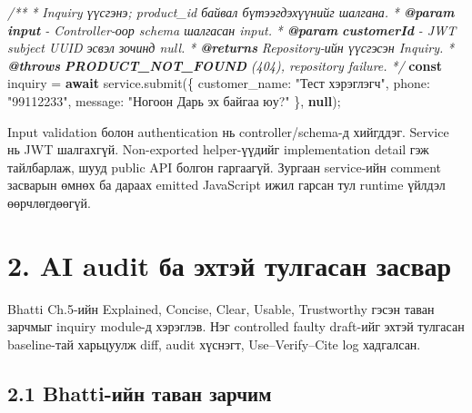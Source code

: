 \documentclass[
  mongolian,
]{article}
\newenvironment{Shaded}{}{}
\newcommand{\AnnotationTok}[1]{\textcolor[rgb]{0.38,0.63,0.69}{\textbf{\textit{#1}}}}
\newcommand{\CommentTok}[1]{\textcolor[rgb]{0.38,0.63,0.69}{\textit{#1}}}
\newcommand{\CommentVarTok}[1]{\textcolor[rgb]{0.38,0.63,0.69}{\textbf{\textit{#1}}}}
\newcommand{\ControlFlowTok}[1]{\textcolor[rgb]{0.00,0.44,0.13}{\textbf{#1}}}
\newcommand{\FunctionTok}[1]{\textcolor[rgb]{0.02,0.16,0.49}{#1}}
\newcommand{\KeywordTok}[1]{\textcolor[rgb]{0.00,0.44,0.13}{\textbf{#1}}}
\newcommand{\NormalTok}[1]{#1}
\newcommand{\OperatorTok}[1]{\textcolor[rgb]{0.40,0.40,0.40}{#1}}
\newcommand{\StringTok}[1]{\textcolor[rgb]{0.25,0.44,0.63}{#1}}
\begin{document}
\begin{Shaded}
\begin{Highlighting}[]
\CommentTok{/**}
\CommentTok{ * Inquiry үүсгэнэ; product\_id байвал бүтээгдэхүүнийг шалгана.}
\CommentTok{ * }\AnnotationTok{@param}\CommentTok{ }\CommentVarTok{input}\CommentTok{ {-} Controller{-}оор schema шалгасан input.}
\CommentTok{ * }\AnnotationTok{@param}\CommentTok{ }\CommentVarTok{customerId}\CommentTok{ {-} JWT subject UUID эсвэл зочинд null.}
\CommentTok{ * }\AnnotationTok{@returns}\CommentTok{ Repository{-}ийн үүсгэсэн Inquiry.}
\CommentTok{ * }\AnnotationTok{@throws}\CommentTok{ }\CommentVarTok{PRODUCT\_NOT\_FOUND}\CommentTok{ (404), repository failure.}
\CommentTok{ */}
\KeywordTok{const}\NormalTok{ inquiry }\OperatorTok{=} \ControlFlowTok{await}\NormalTok{ service}\OperatorTok{.}\FunctionTok{submit}\NormalTok{(\{}
\NormalTok{  customer\_name}\OperatorTok{:} \StringTok{"Тест хэрэглэгч"}\OperatorTok{,}
\NormalTok{  phone}\OperatorTok{:} \StringTok{"99112233"}\OperatorTok{,}
\NormalTok{  message}\OperatorTok{:} \StringTok{"Ногоон Дарь эх байгаа юу?"}
\NormalTok{\}}\OperatorTok{,} \KeywordTok{null}\NormalTok{)}\OperatorTok{;}
\end{Highlighting}
\end{Shaded}

Input validation болон authentication нь controller/schema-д хийгддэг.
Service нь JWT шалгахгүй. Non-exported helper-үүдийг implementation
detail гэж тайлбарлаж, шууд public API болгон гаргаагүй. Зургаан
service-ийн comment засварын өмнөх ба дараах emitted JavaScript ижил
гарсан тул runtime үйлдэл өөрчлөгдөөгүй.

\clearpage

\section{2. AI audit ба эхтэй тулгасан
засвар}\label{ai-audit-ux431ux430-ux44dux445ux442ux44dux439-ux442ux443ux43bux433ux430ux441ux430ux43d-ux437ux430ux441ux432ux430ux440}

Bhatti Ch.5-ийн Explained, Concise, Clear, Usable, Trustworthy гэсэн
таван зарчмыг inquiry module-д хэрэглэв. Нэг controlled faulty draft-ийг
эхтэй тулгасан baseline-тай харьцуулж diff, audit хүснэгт,
Use--Verify--Cite log хадгалсан.

\subsection{2.1 Bhatti-ийн таван
зарчим}\label{bhatti-ux438ux439ux43d-ux442ux430ux432ux430ux43d-ux437ux430ux440ux447ux438ux43c}
\end{document}
